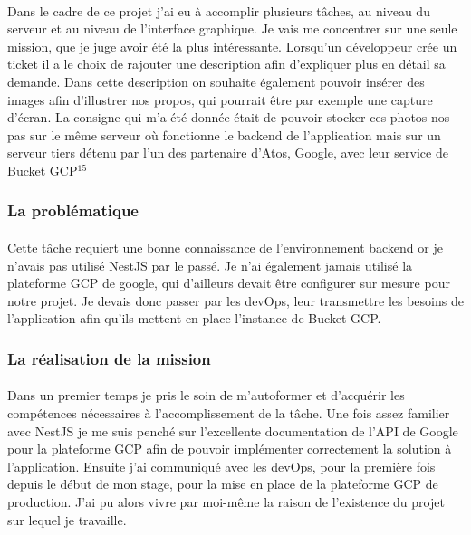 \documentclass[12pt]{article}
\begin{document}
\begin {sloppypar}
\paragraph{}
Dans le cadre de ce projet j'ai eu à accomplir plusieurs tâches, au niveau du serveur et au niveau de 
l'interface graphique. Je vais me concentrer sur une seule mission, que je juge avoir été la plus 
intéressante. Lorsqu'un développeur crée un ticket il a le choix de rajouter une description afin 
d'expliquer plus en détail sa demande. Dans cette description on souhaite également pouvoir insérer 
des images afin d'illustrer nos propos, qui pourrait être par exemple une capture d'écran. La consigne 
qui m'a été donnée était de pouvoir stocker ces photos nos pas sur le même serveur où fonctionne 
le backend de l'application mais sur un serveur tiers détenu par l'un des partenaire d'Atos, Google, 
avec leur service de Bucket GCP$^{15}$

\subsubsection{La problématique}
\paragraph{}
Cette tâche requiert une bonne connaissance de l'environnement backend or je n'avais pas utilisé 
NestJS par le passé. Je n'ai également jamais utilisé la plateforme GCP de google, qui d'ailleurs 
devait être configurer sur mesure pour notre projet. Je devais donc passer par les devOps,
leur transmettre les besoins de l'application afin qu'ils mettent en place l'instance de Bucket GCP.

\subsubsection{La réalisation de la mission}
\paragraph{}
Dans un premier temps je pris le soin de m'autoformer et d'acquérir les compétences nécessaires 
à l'accomplissement de la tâche. Une fois assez familier avec NestJS je me suis penché sur l'excellente
documentation de l'API de Google pour la plateforme GCP afin de pouvoir implémenter correctement 
la solution à l'application. Ensuite j'ai communiqué avec les devOps, pour la première fois depuis 
le début de mon stage, pour la mise en place de la plateforme GCP de production. J'ai pu alors vivre 
par moi-même la raison de l'existence du projet sur lequel je travaille. 


\end{sloppypar}
\end{document}
